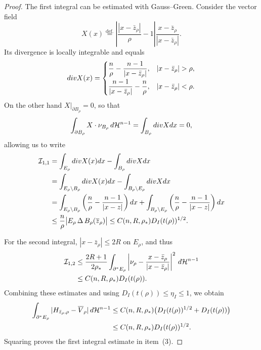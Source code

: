 \documentclass[10pt,a4paper]{amsart}
\newcommand{\dHn}{\,\dd\mathcal{H}^{n-1}}
\def\dd{{\rm d}}
\def\ddiv{{\mathop{\rm div}}}
\newcommand{\eqdef}{\overset{\text{def.}}{=}}
\begin{document}
\begin{proof}
The first integral can be estimated with Gauss--Green. Consider the vector
field
\[
 X(x)\eqdef\left|\frac{|x-\bar z_\rho|}{\rho}-1\right|
 \frac{x-\bar z_\rho}{|x-\bar z_\rho|}.
\]
Its divergence is locally integrable and equals
\[
 \ddiv X(x)=
 \begin{cases}
 \dfrac n\rho-\dfrac{n-1}{|x-\bar z_\rho|},
 &|x-\bar z_\rho|>\rho,\\[8pt]
 \dfrac{n-1}{|x-\bar z_\rho|}-\dfrac n\rho,
 &|x-\bar z_\rho|<\rho.
 \end{cases}
\]
On the other hand $X\big|_{\partial B_\rho}=0$, so that
\[
  \int_{\partial B_\rho}X\cdot\nu_{B_\rho}\dHn=\int_{B_\rho}\ddiv X\dd x=0,
\]
allowing us to write
\begin{equation}\label{eq.I11_estimate}
  \begin{aligned}
    \mathcal{I}_{1,1}&=
    \int_{E_\rho}\ddiv X(x)\dd x-\int_{B_\rho}\ddiv X\dd x \\
    &=\int_{E_\rho\setminus B_\rho}\ddiv X(x)\dd x-\int_{B_\rho\setminus E_\rho}\ddiv X\dd x\\
    &=\int_{E_\rho\setminus B_\rho}\left(\frac{n}{\rho}-\frac{n-1}{|x-z|}\right)\dd x
    +\int_{B_\rho\setminus E_\rho}\left(\frac{n}{\rho}-\frac{n-1}{|x-z|}\right)\dd x\\
    &\le\frac{n}{\rho}\bigl|E_\rho\,\Delta\,B_\rho(\overline{z}_\rho)\bigr|
    \le C(n,R,\rho_*)D_I(t(\rho))^{1/2}.
  \end{aligned}
\end{equation}

For the second integral, $|x-\bar z_\rho|\le2R$ on $E_\rho$, and thus
\begin{align}
 \mathcal I_{1,2}
 &\le\frac{2R+1}{2\rho_*}
 \int_{\partial^*E_\rho}
 \left|\nu_\rho-\frac{x-\bar z_\rho}{|x-\bar z_\rho|}\right|^2\dHn\notag\\
 &\le C(n,R,\rho_*)D_I(t(\rho)).
 \label{eq.I12_estimate}
\end{align}
Combining these estimates and using $D_I(t(\rho))\le\eta_I\le1$, we obtain
\begin{align*}
 \int_{\partial^*E_\rho}
 |H_{\bar z_\rho,\rho}-\overline V_\rho|\dHn
 &\le C(n,R,\rho_*)
 \bigl(D_I(t(\rho))^{1/2}+D_I(t(\rho))\bigr)\\
 &\le C(n,R,\rho_*)D_I(t(\rho))^{1/2}.
\end{align*}
Squaring proves the first integral estimate in item~(3).


\end{proof}
\end{document}

